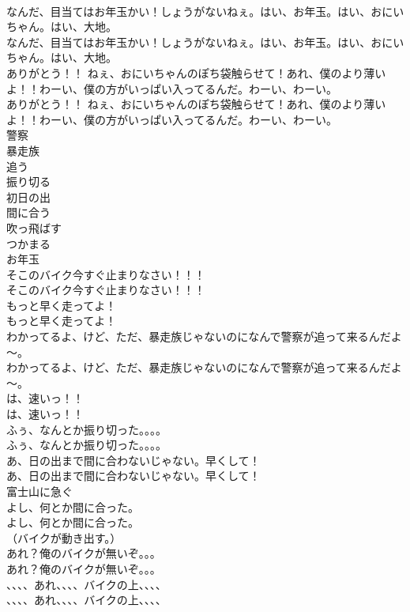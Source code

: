 \documentclass[8pt]{extreport}
\begin{document}
\begin{CJK}{UTF8}{min}
\\	なんだ、目当てはお年玉かい！しょうがないねぇ。はい、お年玉。はい、おにいちゃん。はい、大地。	
\\	なんだ、目当てはお年玉かい！しょうがないねぇ。はい、お年玉。はい、おにいちゃん。はい、大地。 
\\	ありがとう！！ ねぇ、おにいちゃんのぽち袋触らせて！あれ、僕のより薄いよ！！わーい、僕の方がいっぱい入ってるんだ。わーい、わーい。	
\\	ありがとう！！ ねぇ、おにいちゃんのぽち袋触らせて！あれ、僕のより薄いよ！！わーい、僕の方がいっぱい入ってるんだ。わーい、わーい。 
\\	警察
\\	暴走族
\\	追う
\\	振り切る
\\	初日の出
\\	間に合う
\\	吹っ飛ばす
\\	つかまる
\\	お年玉
\\	そこのバイク今すぐ止まりなさい！！！	
\\	そこのバイク今すぐ止まりなさい！！！ 
\\	もっと早く走ってよ！	
\\	もっと早く走ってよ！ 
\\	わかってるよ、けど、ただ、暴走族じゃないのになんで警察が追って来るんだよ～。	
\\	わかってるよ、けど、ただ、暴走族じゃないのになんで警察が追って来るんだよ～。 
\\	は、速いっ！！	
\\	は、速いっ！！ 
\\	ふぅ、なんとか振り切った。。。。	
\\	ふぅ、なんとか振り切った。。。。 
\\	あ、日の出まで間に合わないじゃない。早くして！	
\\	あ、日の出まで間に合わないじゃない。早くして！ 
\\	富士山に急ぐ	
\\	よし、何とか間に合った。	
\\	よし、何とか間に合った。 
\\	（バイクが動き出す。）
\\	あれ？俺のバイクが無いぞ。。。	
\\	あれ？俺のバイクが無いぞ。。。 
\\	、、、、あれ、、、、バイクの上、、、、	
\\	、、、、あれ、、、、バイクの上、、、、 

\end{CJK}
\end{document}
